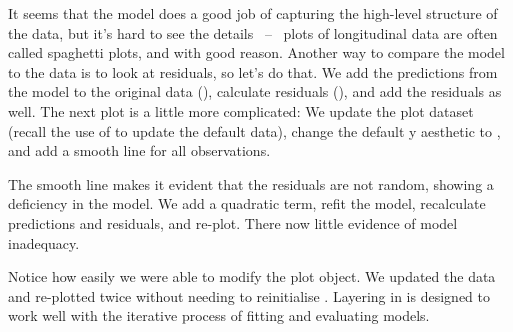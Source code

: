 % 


It seems that the model does a good job of capturing the high-level structure of the data, but it's hard to see the details ~--~ plots of longitudinal data are often called spaghetti plots, and with good reason.  Another way to compare the model to the data is to look at residuals, so let's do that.  We add the predictions from the model to the original data (), calculate residuals (), and add the residuals as well.  The next plot is a little more complicated: We update the plot dataset (recall the use of \code{\%+\%} to update the default data), change the default y aesthetic to , and add a smooth line for all observations.

% 
% 


The smooth line makes it evident that the residuals are not random, showing a deficiency in the model.  We add a quadratic term, refit the model, recalculate predictions and residuals, and re-plot.  There now little evidence of model inadequacy.

% 
% 


Notice how easily we were able to modify the plot object.  We updated the data and re-plotted twice without needing to reinitialise .  Layering in \ggplot is designed to work well with the iterative process of fitting and evaluating models.


